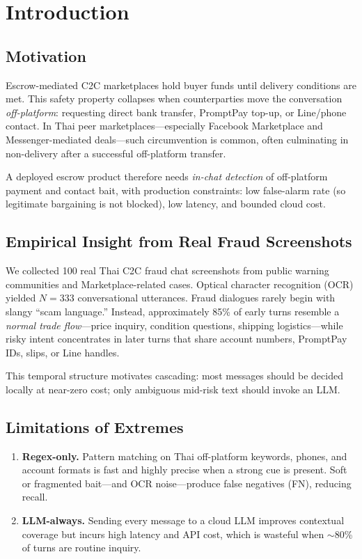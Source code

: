 \documentclass[conference]{IEEEtran}
\begin{document}
\section{Introduction}

\subsection{Motivation}
Escrow-mediated C2C marketplaces hold buyer funds until delivery conditions are
met. This safety property collapses when counterparties move the conversation
\emph{off-platform}: requesting direct bank transfer, PromptPay top-up, or
Line/phone contact. In Thai peer marketplaces---especially Facebook Marketplace
and Messenger-mediated deals---such circumvention is common, often culminating
in non-delivery after a successful off-platform transfer.

A deployed escrow product therefore needs \emph{in-chat detection} of
off-platform payment and contact bait, with production constraints: low
false-alarm rate (so legitimate bargaining is not blocked), low latency, and
bounded cloud cost.

\subsection{Empirical Insight from Real Fraud Screenshots}
We collected 100 real Thai C2C fraud chat screenshots from public warning
communities and Marketplace-related cases. Optical character recognition (OCR)
yielded $N{=}333$ conversational utterances. Fraud dialogues rarely begin with
slangy ``scam language.'' Instead, approximately 85\% of early turns resemble a
\emph{normal trade flow}---price inquiry, condition questions, shipping
logistics---while risky intent concentrates in later turns that share account
numbers, PromptPay IDs, slips, or Line handles.

This temporal structure motivates cascading: most messages should be decided
locally at near-zero cost; only ambiguous mid-risk text should invoke an LLM.

\subsection{Limitations of Extremes}
\begin{enumerate}
  \item \textbf{Regex-only.} Pattern matching on Thai off-platform keywords,
        phones, and account formats is fast and highly precise when a strong cue
        is present. Soft or fragmented bait---and OCR noise---produce false
        negatives (FN), reducing recall.
  \item \textbf{LLM-always.} Sending every message to a cloud LLM improves
        contextual coverage but incurs high latency and API cost, which is
        wasteful when ${\sim}$80\% of turns are routine inquiry.
\end{enumerate}
\end{document}

